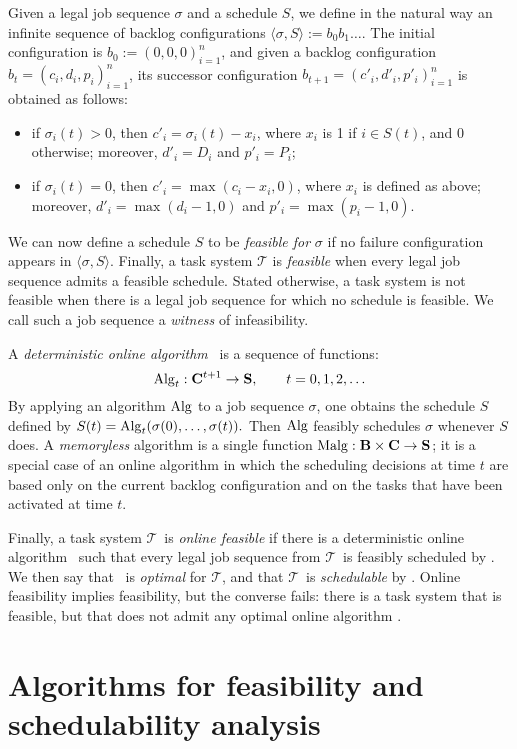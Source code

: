 \documentclass{llncs}
\newcommand{\tsys}{\ensuremath{\mathcal{T}}}
\newcommand{\seq}{\ensuremath{\sigma}}
\newcommand{\sched}{\ensuremath{S}}
\newcommand{\backlog}{\ensuremath{\mathbf{B}}}
\begin{document}
Given a legal job sequence $\seq$ and a schedule \sched, we define in the natural way an infinite sequence of backlog configurations $\langle \seq,\sched \rangle := b_0 b_1 \ldots$. The initial configuration is $b_0 := (0,0,0)_{i=1}^n$, and given a backlog configuration $b_t = (c_i,d_i,p_i)_{i=1}^n$, its successor configuration $b_{t+1} = (c'_i,d'_i,p'_i)_{i=1}^n$ is obtained as follows: 
\begin{itemize}
\item if $\seq_i(t) > 0$, then $c'_i = \seq_i(t) - x_i$, where $x_i$ is 1 if $i \in \sched(t)$, and 0 otherwise; moreover, $d'_i = D_i$ and $p'_i = P_i$; 
\item if $\seq_i(t) = 0$, then $c'_i = \max(c_i - x_i,0)$, where $x_i$ is defined as above; moreover, $d'_i = \max(d_i - 1,0)$ and $p'_i = \max(p_i - 1,0)$.  
\end{itemize}
We can now define a schedule $S$ to be \emph{feasible for} $\seq$ if no failure configuration appears in $\langle \seq, \sched \rangle$. Finally, a task system $\tsys$ is \emph{feasible} when every legal job sequence admits a feasible schedule. Stated otherwise, a task system is not feasible when there is a legal job sequence for which no schedule is feasible. We call such a job sequence a \emph{witness} of infeasibility. 

A \emph{deterministic online algorithm} \alg\ is a sequence of functions: 
$$ \mathrm{Alg}_t : \mathbf{C}^{t+1} \to \mathbf{S}, \qquad t = 0,1,2,\ldots$$
By applying an algorithm $\mathrm{Alg}$ to a job sequence $\seq$, one obtains the schedule $S$ defined by $S(t) = \alg_t( \seq(0), \ldots, \seq(t) ). $ Then $\mathrm{Alg}$ feasibly schedules $\seq$ whenever $S$ does. 
\newcommand{\malg}{\ensuremath{\mathrm{Malg}}}
A \emph{memoryless} algorithm is a single function $\malg: \backlog \times \rct \to \scheddec$; it is a special case of an online algorithm in which the scheduling decisions at time $t$ are based only on the current backlog configuration and on the tasks that have been activated at time $t$. 


Finally, a task system \tsys\ is \emph{online feasible} if there is a deterministic online algorithm \alg\ such that every legal job sequence from \tsys\ is feasibly scheduled by \alg. We then say that \alg\  is  \emph{optimal} for \tsys, and that \tsys\ is \emph{schedulable} by \alg.  
Online feasibility implies feasibility, but the converse fails: there is a task system that is feasible, but that does not admit any optimal online algorithm \cite{Fisher:2009}. 

\section{Algorithms for feasibility and schedulability analysis}
\label{sec:algorithms}
\end{document}
